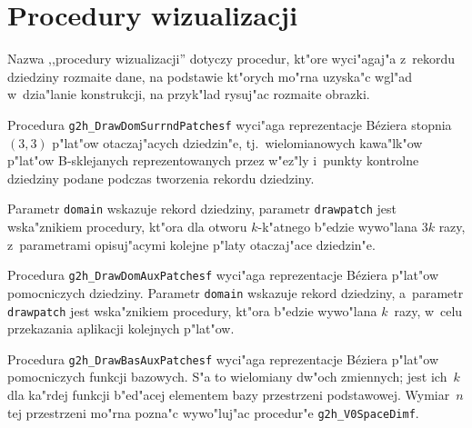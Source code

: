 \vspace{\bigskipamount}


\newpage
\section{Procedury wizualizacji}

Nazwa ,,procedury wizualizacji'' dotyczy procedur, kt"ore wyci"agaj"a
z~rekordu dziedziny rozmaite dane, na podstawie kt"orych mo"rna uzyska"c
wgl"ad w~dzia"lanie konstrukcji, na przyk"lad rysuj"ac rozmaite obrazki.

\vspace{\bigskipamount}
Procedura \texttt{g2h\_DrawDomSurrndPatchesf} wyci"aga reprezentacje
B\'{e}ziera stopnia~$(3,3)$ p"lat"ow otaczaj"acych dziedzin"e,
tj.\ wielomianowych kawa"lk"ow p"lat"ow B-sklejanych reprezentowanych
przez w"ez"ly i~punkty kontrolne dziedziny podane podczas tworzenia
rekordu dziedziny.

Parametr \texttt{domain} wskazuje rekord dziedziny, parametr
\texttt{drawpatch} jest wska"znikiem procedury, kt"ora dla otworu
$k$-k"atnego b"edzie wywo"lana $3k$ razy, z~parametrami opisuj"acymi kolejne
p"laty otaczaj"ace dziedzin"e.


\vspace{\bigskipamount}
Procedura \texttt{g2h\_DrawDomAuxPatchesf} wyci"aga reprezentacje B\'{e}ziera
p"lat"ow pomocniczych dziedziny. Parametr \texttt{domain} wskazuje rekord
dziedziny, a~parametr \texttt{drawpatch} jest wska"znikiem procedury,
kt"ora b"edzie wywo"lana $k$~razy, w~celu przekazania aplikacji
kolejnych p"lat"ow.

\vspace{\bigskipamount}
Procedura \texttt{g2h\_DrawBasAuxPatchesf} wyci"aga reprezentacje B\'{e}ziera
p"lat"ow pomocniczych funkcji bazowych. S"a to wielomiany dw"och zmiennych;
jest ich~$k$ dla ka"rdej funkcji b"ed"acej elementem bazy przestrzeni
podstawowej. Wymiar~$n$ tej przestrzeni mo"rna pozna"c wywo"luj"ac
procedur"e \texttt{g2h\_V0SpaceDimf}.

